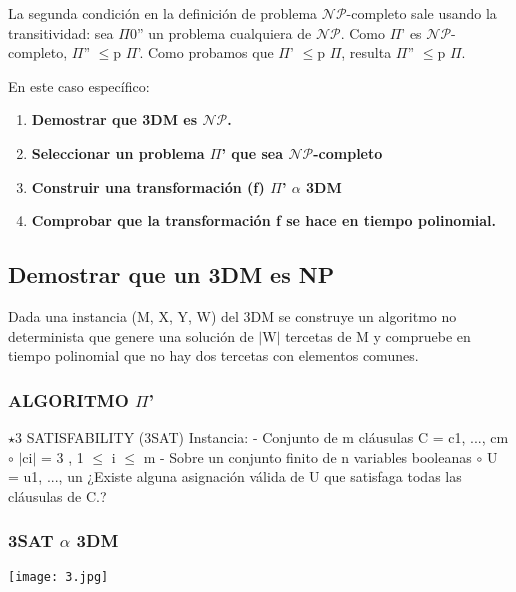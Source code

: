\documentclass[a4paper,10pt]{article}
\begin{document}
	La segunda condición en la definición de problema $\mathcal{NP}$-completo sale usando la transitividad: sea $\Pi$0'' un problema cualquiera de $\mathcal{NP}$. Como $\Pi$' es $\mathcal{NP}$-completo, $\Pi$'' $\leq$p $\Pi$'. Como probamos que $\Pi$' $\leq$p $\Pi$, resulta $\Pi$'' $\leq$p $\Pi$.

En este caso específico:
\begin{enumerate}
		\item \textbf{Demostrar que 3DM es $\mathcal{NP}$.}
		\item \textbf{Seleccionar un problema $\Pi$' que sea $\mathcal{NP}$-completo}
		\item \textbf{Construir una transformación (f) $\Pi$' $\alpha$ 3DM }
		\item \textbf{Comprobar que la transformación f se hace en tiempo polinomial.}
	\end{enumerate}
	
	\subsection{Demostrar que un 3DM es NP}
		Dada una instancia (M, X, Y, W) del 3DM se construye un algoritmo no determinista que genere una solución de $\mid$W$\mid$ tercetas de M y compruebe en tiempo polinomial que no hay dos tercetas con elementos comunes.
		
		\subsubsection{ALGORITMO $\Pi$'} 
		$\star$3 SATISFABILITY (3SAT)
		 Instancia:
			-	Conjunto de m cláusulas C = {c1, ..., cm}
				$\circ$	$\mid$ci$\mid$ = 3 , 1 $\leq$ i $\leq$ m
			-	Sobre un conjunto finito de n variables booleanas
				$\circ$	U = {u1, ..., un}
		¿Existe alguna asignación válida de U que satisfaga todas las cláusulas de C.?

		\subsubsection{3SAT $\alpha$ 3DM} 
		
		\texttt{[image: 3.jpg]}
		
\end{document}
